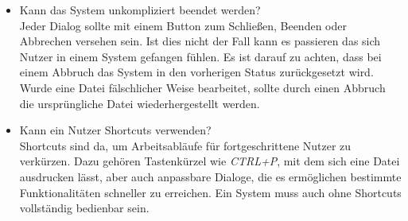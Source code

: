 \begin{description}
\begin{itemize}
\item Kann das System unkompliziert beendet werden?\\
Jeder Dialog sollte mit einem Button zum Schließen, Beenden oder Abbrechen versehen sein. Ist dies nicht der Fall kann es passieren das sich Nutzer in einem System gefangen fühlen. Es ist darauf zu achten, dass bei einem Abbruch das System in den vorherigen Status zurückgesetzt wird. Wurde eine Datei fälschlicher Weise bearbeitet, sollte durch einen Abbruch die ursprüngliche Datei wiederhergestellt werden. %
\cite[S. 138 f.]{Nielsen:1994vk}

\item Kann ein Nutzer Shortcuts verwenden?\\
Shortcuts sind da, um Arbeitsabläufe für fortgeschrittene Nutzer zu verkürzen. Dazu gehören Tastenkürzel wie \textit{\glqq CTRL+P\grqq}, mit dem sich eine Datei ausdrucken lässt, aber auch anpassbare Dialoge, die es ermöglichen bestimmte Funktionalitäten schneller zu erreichen. Ein System muss auch ohne Shortcuts vollständig bedienbar sein. %
\cite[S. 139 ff.]{Nielsen:1994vk}


\end{itemize}
\end{description}
